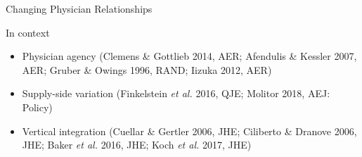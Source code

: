 \documentclass[t,aspectratio=169]{beamer}
\begin{document}
\begin{frame}{Changing Physician Relationships}
\end{frame}

\begin{frame}{In context}
    \begin{itemize}
        \item Physician agency (Clemens \& Gottlieb 2014, AER; Afendulis \& Kessler 2007, AER; Gruber \& Owings 1996, RAND; Iizuka 2012, AER)
        \item Supply-side variation (Finkelstein \textit{et al.} 2016, QJE; Molitor 2018, AEJ: Policy)
        \item Vertical integration (Cuellar \& Gertler 2006, JHE; Ciliberto \& Dranove 2006, JHE; Baker \textit{et al.} 2016, JHE; Koch \textit{et al.} 2017, JHE)
    \end{itemize}
\end{frame}
\end{document}
